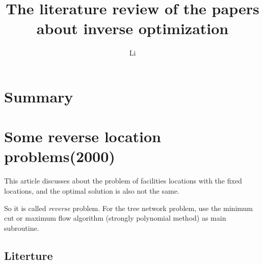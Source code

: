 \documentclass[UTF8]{article}
\title{The literature review of the papers about inverse optimization}
\author{Li}
\begin{document}
\maketitle{}

\section{Summary}




\section{Some reverse location problems(2000)}

This article discusses about the problem of facilities locations with the fixed locations, and the optimal solution is also not the same.

So it is called \emph{reverse} problem. For the tree network problem, use the minimum cut or maximum flow algorithm (strongly polynomial method) as main subroutine.

\subsection{Literture}
\end{document}
